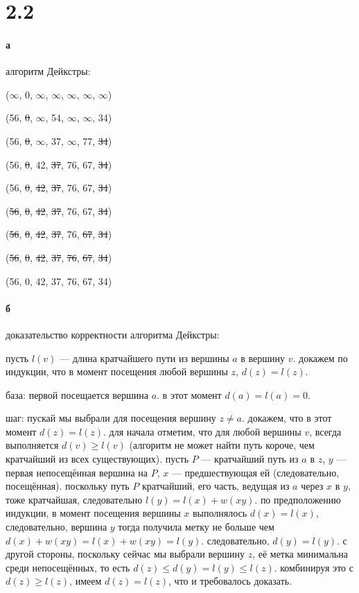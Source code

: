 \documentclass[russian]{article}
\begin{document}
\section*{2.2}

\paragraph*{а} алгоритм Дейкстры:

($\infty$, 0, $\infty$, $\infty$, $\infty$, $\infty$, $\infty$)

(56, \sout{0}, $\infty$, 54, $\infty$, $\infty$, 34)

(56, \sout{0}, $\infty$, 37, $\infty$, 77, \sout{34})

(56, \sout{0}, 42, \sout{37}, 76, 67, \sout{34})

(56, \sout{0}, \sout{42}, \sout{37}, 76, 67, \sout{34})

(\sout{56}, \sout{0}, \sout{42}, \sout{37}, 76, 67, \sout{34})

(\sout{56}, \sout{0}, \sout{42}, \sout{37}, 76, \sout{67}, \sout{34})

(\sout{56}, \sout{0}, \sout{42}, \sout{37}, \sout{76}, \sout{67}, \sout{34})

(56, 0, 42, 37, 76, 67, 34)

\paragraph*{б} доказательство корректности алгоритма Дейкстры:

пусть $l(v)$ — длина кратчайшего пути из вершины $a$ в вершину $v$. докажем по индукции, что в момент посещения любой вершины $z$, $d(z)=l(z)$.

база: первой посещается вершина $a$. в этот момент $d(a)=l(a)=0$.

шаг: пускай мы выбрали для посещения вершину $z \ne a$. докажем, что в этот момент $d(z)=l(z)$. для начала отметим, что для любой вершины $v$, всегда выполняется $d(v) \ge l(v)$ (алгоритм не может найти путь короче, чем кратчайший из всех существующих). пусть $P$ — кратчайший путь из $a$ в $z$, $y$ — первая непосещённая вершина на $P$, $x$ — предшествующая ей (следовательно, посещённая). поскольку путь $P$ кратчайший, его часть, ведущая из $a$ через $x$ в $y$, тоже кратчайшая, следовательно $l(y)=l(x)+w(xy)$. по предположению индукции, в момент посещения вершины $x$ выполнялось $d(x)=l(x)$, следовательно, вершина $y$ тогда получила метку не больше чем $d(x)+w(xy)=l(x)+w(xy)=l(y)$. следовательно, $d(y)=l(y)$. с другой стороны, поскольку сейчас мы выбрали вершину $z$, её метка минимальна среди непосещённых, то есть $d(z) \le d(y) = l(y) \le l(z)$. комбинируя это с $d(z) \ge l(z)$, имеем $d(z)=l(z)$, что и требовалось доказать.
\end{document}
